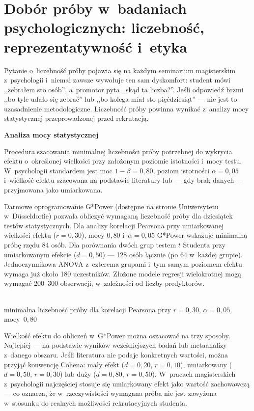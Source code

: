 \documentclass[12pt,a4paper,twoside,openany]{book}
\let\bforigsection\section
\renewcommand{\section}{\needspace{4\baselineskip}\bforigsection}
\newcommand{\bignumber}[2]{%
  \par\vspace{8pt}\noindent\begin{minipage}{\linewidth}\centering
  {\headingfont\bfseries\color{accent}\fontsize{40}{44}\selectfont #1}\\[3pt]
  {\sffamily\small\color{sectioncolor}#2}
  \end{minipage}\vspace{6pt}\par
}
\newcommand{\concept}[2]{%
  \par\vspace{6pt}
  \begin{tcolorbox}[enhanced, breakable, colback=accent!6, colframe=accent,
    boxrule=0pt, leftrule=3.5pt, arc=2pt, drop fuzzy shadow={black!15},
    left=10pt, right=10pt, top=7pt, bottom=7pt, before upper={\parindent0pt}]
    {\sffamily\bfseries\color{accent}#1}\par\vspace{2pt}\small #2
  \end{tcolorbox}\par
}
\begin{document}
\section{Dobór próby w~badaniach psychologicznych: liczebność, reprezentatywność i~etyka}

Pytanie o~liczebność próby pojawia się na każdym seminarium magisterskim z~psychologii i~niemal zawsze wywołuje ten sam dyskomfort: student mówi ,,zebrałem sto osób'', a~promotor pyta ,,skąd ta liczba?''. Jeśli odpowiedź brzmi ,,bo tyle udało się zebrać'' lub ,,bo kolega miał sto pięćdziesiąt'' --- nie jest to uzasadnienie metodologiczne. Liczebność próby powinna wynikać z~analizy mocy statystycznej przeprowadzonej przed rekrutacją.

\concept{Analiza mocy statystycznej}{Procedura szacowania minimalnej liczebności próby potrzebnej do wykrycia efektu o~określonej wielkości przy założonym poziomie istotności i~mocy testu. W~psychologii standardem jest moc $1-\beta = 0{,}80$, poziom istotności $\alpha = 0{,}05$ i~wielkość efektu szacowana na podstawie literatury lub --- gdy brak danych --- przyjmowana jako umiarkowana.}

Darmowe oprogramowanie G*Power (dostępne na stronie Uniwersytetu w~Düsseldorfie) pozwala obliczyć wymaganą liczebność próby dla dziesiątek testów statystycznych. Dla analizy korelacji Pearsona przy umiarkowanej wielkości efektu ($r = 0{,}30$), mocy $0{,}80$ i~$\alpha = 0{,}05$ G*Power wskazuje minimalną próbę rzędu 84 osób. Dla porównania dwóch grup testem $t$ Studenta przy umiarkowanym efekcie ($d = 0{,}50$) --- 128 osób łącznie (po 64 w~każdej grupie). Jednoczynnikowa ANOVA z~czterema grupami i~tym samym poziomem efektu wymaga już około 180 uczestników. Złożone modele regresji wielokrotnej mogą wymagać 200--300 obserwacji, w~zależności od liczby predyktorów.

\bignumber{84}{minimalna liczebność próby dla korelacji Pearsona przy $r=0{,}30$, $\alpha=0{,}05$, mocy~$0{,}80$}

Wielkość efektu do obliczeń w~G*Power można oszacować na trzy sposoby. Najlepiej --- na podstawie wyników wcześniejszych badań lub metaanalizy z~danego obszaru. Jeśli literatura nie podaje konkretnych wartości, można przyjąć konwencję Cohena: mały efekt ($d = 0{,}20$, $r = 0{,}10$), umiarkowany ($d = 0{,}50$, $r = 0{,}30$) lub duży ($d = 0{,}80$, $r = 0{,}50$). W~pracach magisterskich z~psychologii najczęściej stosuje się umiarkowany efekt jako wartość zachowawczą --- co oznacza, że w~rzeczywistości wymagana próba nie jest zawyżona w~stosunku do realnych możliwości rekrutacyjnych studenta.
\end{document}
